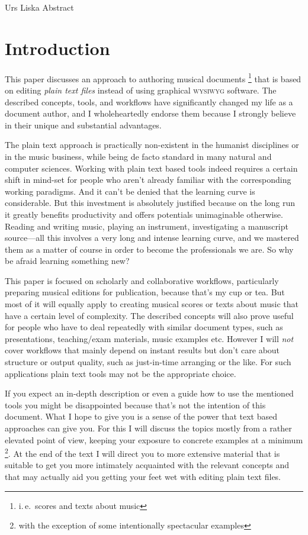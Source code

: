 \documentclass[../../LilyPond-Tutorials]{subfiles}
\begin{document}
\begin{authorAbstract}{Urs Liska}
Abstract
\end{authorAbstract}

\chapter*{Introduction}
\label{chap:pt_introduction}
This paper discusses an approach to authoring musical documents%
\footnote{i.\,e.\ scores and texts about music}
that is based on editing \emph{plain text files} instead of using graphical \textsc{wysiwyg} software.
The described concepts, tools, and workflows have significantly changed my life as a document author, and I  wholeheartedly endorse them because I strongly believe in their unique and substantial advantages.

The plain text approach is practically non-existent in the humanist disciplines or in the music business, while being de facto standard in many natural and computer sciences.
Working with plain text based tools indeed requires a certain shift in mind-set for people who aren't already familiar with the corresponding working paradigms.
And it can't be denied that the learning curve is considerable.
But this investment is absolutely justified because on the long run it greatly benefits productivity and offers potentials unimaginable otherwise.
Reading and writing music, playing an instrument, investigating a manuscript source---all this involves a very long and intense learning curve, and we mastered them as a matter of course in order to become the professionals we are.
So why be afraid learning something new?

This paper is focused on scholarly and collaborative workflows, particularly preparing musical editions for publication, because that's my cup or tea.
But most of it will equally apply to creating musical scores or texts about music that have a certain level of complexity.
The described concepts will also prove useful for people who have to deal repeatedly with similar document types, such as presentations, teaching/exam materials, music examples etc.
However I will \emph{not} cover workflows that mainly depend on instant results but don't care about structure or output quality, such as just-in-time arranging or the like.
For such applications plain text tools may not be the appropriate choice.

If you expect an in-depth description or even a guide how to use the mentioned tools you might be disappointed because that's not the intention of this document.
What I hope to give you is a sense of the power that text based approaches can give you.
For this I will discuss the topics mostly from a rather elevated point of view, keeping your exposure to concrete examples at a minimum%
\footnote{with the exception of some intentionally spectacular examples}.
At the end of the text I will direct you to more extensive material that is suitable to get you more intimately acquainted with the relevant concepts and that may actually aid you getting your feet wet with editing plain text files.
\end{document}
